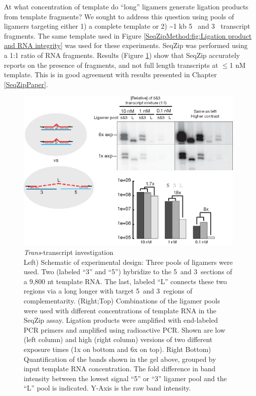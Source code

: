     At what concentration of template do ``long'' ligamers generate ligation products from template fragments? We sought to address this question using pools of ligamers targeting either 1) a complete template or 2) \textasciitilde 1 kb 5\textprime~ and 3\textprime~ transcript fragments. The same template used in Figure \ref{SeqZipMethod:fig:Ligation product and RNA integrity} was used for these experiments. SeqZip was performed using a 1:1 ratio of RNA fragments. Results (Figure \ref{SeqZipMethod:fig: trans Tx for degradation}) show that SeqZip accurately reports on the presence of fragments, and not full length transcripts at $\le$1 nM template. This is in good agreement with results presented in Chapter \ref{SeqZipPaper}.

  	\begin{figure} %
    	\centering 
    	\includegraphics{Figures/SeqZipMethod/TransRNAWithSeqZip.eps}
    	\caption[Trans Transcript investigation]
    	{
	      \textit{Trans}-transcript investigation\\[0.25cm]
  	    Left) Schematic of experimental design: Three pools of ligamers were used. Two (labeled ``3'' and ``5'') hybridize to the 5\textprime~and 3\textprime~sections of a 9,800 nt template RNA. The last, labeled ``L'' connects these two regions via a long longer with target 5\textprime~and 3\textprime~regions of complementarity. (Right;Top) Combinations of the ligamer pools were used with different concentrations of template RNA in the SeqZip assay. Ligation products were amplified with end-labeled PCR primers and amplified using radioactive PCR. Shown are low (left column) and high (right column) versions of two different exposure times (1x on bottom and 6x on top). Right Bottom) Quantification of the bands shown in the gel above, grouped by input template RNA concentration. The fold difference in band intensity between the lowest signal ``5'' or ``3'' ligamer pool and the ``L'' pool is indicated. Y-Axis is the raw band intensity.
		    }
   	 \label{SeqZipMethod:fig: trans Tx for degradation}
	 	 \end{figure}

